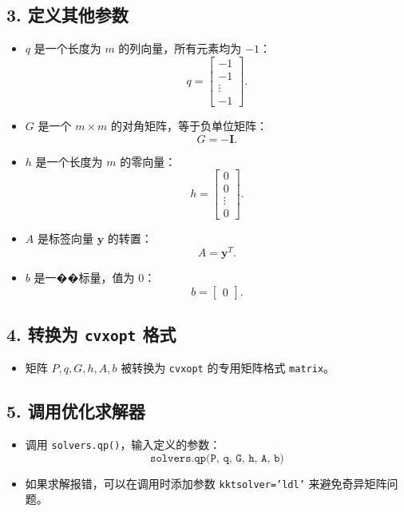 \documentclass[12pt,a4paper,oneside]{article}
\begin{document}
\subsection*{3. 定义其他参数}
\begin{itemize}
    \item $q$ 是一个长度为 $m$ 的列向量，所有元素均为 $-1$：
    \[
    q = \begin{bmatrix} -1 \\ -1 \\ \vdots \\ -1 \end{bmatrix}.
    \]
    \item $G$ 是一个 $m \times m$ 的对角矩阵，等于负单位矩阵：
    \[
    G = -\bm{I}.
    \]
    \item $h$ 是一个长度为 $m$ 的零向量：
    \[
    h = \begin{bmatrix} 0 \\ 0 \\ \vdots \\ 0 \end{bmatrix}.
    \]
    \item $A$ 是标签向量 $\bm{y}$ 的转置：
    \[
    A = \bm{y}^T.
    \]
    \item $b$ 是一��标量，值为 $0$：
    \[
    b = \begin{bmatrix} 0 \end{bmatrix}.
    \]
\end{itemize}

\subsection*{4. 转换为 \texttt{cvxopt} 格式}
\begin{itemize}
    \item 矩阵 $P, q, G, h, A, b$ 被转换为 \texttt{cvxopt} 的专用矩阵格式 \texttt{matrix}。
\end{itemize}

\subsection*{5. 调用优化求解器}
\begin{itemize}
    \item 调用 \texttt{solvers.qp()}，输入定义的参数：
    \[
    \texttt{solvers.qp(P, q, G, h, A, b)}
    \]
    \item 如果求解报错，可以在调用时添加参数 \texttt{kktsolver='ldl'} 来避免奇异矩阵问题。
\end{itemize}
\end{document}
